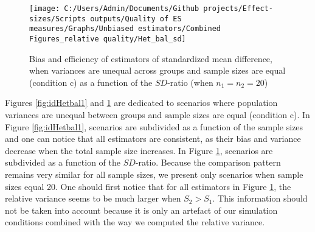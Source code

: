 \documentclass[
  12pt,
  french,
]{article}
\begin{document}
\begin{figure}

{\centering \texttt{[image: C:/Users/Admin/Documents/Github projects/Effect-sizes/Scripts outputs/Quality of ES measures/Graphs/Unbiased estimators/Combined Figures\_relative quality/Het\_bal\_sd]} 

}

\caption{Bias and efficiency of estimators of standardized mean difference, when variances are unequal across groups and sample sizes are equal (condition c) as a function of the $SD$-ratio (when $n_1=n_2=20$)}\label{fig:idHetbal2}
\end{figure}
\newpage

Figures \ref{fig:idHetbal1} and \ref{fig:idHetbal2} are dedicated to
scenarios where population variances are unequal between groups and
sample sizes are equal (condition c). In Figure \ref{fig:idHetbal1},
scenarios are subdivided as a function of the sample sizes and one can
notice that all estimators are consistent, as their bias and variance
decrease when the total sample size increases. In Figure
\ref{fig:idHetbal2}, scenarios are subdivided as a function of the
\(SD\)-ratio. Because the comparison pattern remains very similar for
all sample sizes, we present only scenarios when sample sizes equal 20.
One should first notice that for all estimators in Figure
\ref{fig:idHetbal2}, the relative variance seems to be much larger when
\(S_2>S_1\).
This information should not be taken into account because it is only an
artefact of our simulation conditions combined with the way we computed
the relative variance.
\end{document}
